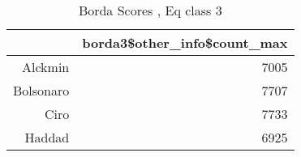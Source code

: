 \begin{table}[ht]
\centering
\begin{tabular}{rr}
  \hline
 & borda3\$other\_info\$count\_max \\ 
  \hline
Alckmin & 7005 \\ 
  Bolsonaro & 7707 \\ 
  Ciro & 7733 \\ 
  Haddad & 6925 \\ 
   \hline
\end{tabular}
\caption{Borda Scores , Eq class 3} 
\label{tbl:subtab2_eq3}
\end{table}
